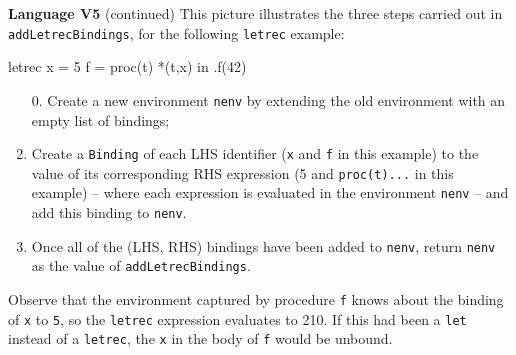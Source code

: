 \begin{minipage}[t]{\sw}
\slidenumber
\LARGE
{\bf Language V5} (continued)\exx
\large
This picture illustrates the three steps
carried out in \verb'addLetrecBindings',
for the following \verb'letrec' example:
\begin{qv}
letrec
    x = 5 
    f = proc(t) *(t,x)
in
    .f(42)
\end{qv}
\begin{enumerate}
\item [0.] Create a new environment \verb'nenv'
      by extending the old environment with an empty list of bindings;
\item Create a \verb'Binding' of each LHS identifier
      (\verb'x' and \verb'f' in this example)
      to the value of its corresponding RHS expression
      (5 and \verb'proc(t)...' in this example) --
      where each expression is evaluated
      in the environment \verb'nenv' --
      and add this binding to \verb'nenv'.
\item Once all of the (LHS, RHS) bindings have been added to \verb'nenv',
      return \verb'nenv' as the value of \verb'addLetrecBindings'.
\end{enumerate}
Observe that the environment captured by procedure \verb'f'
knows about the binding of \verb'x' to \verb'5',
so the \verb'letrec' expression evaluates to 210.
If this had been a \verb'let' instead of a \verb'letrec',
the \verb'x' in the body of \verb'f' would be unbound.
{\center\ \ \\}

\end{minipage}
\clearpage
